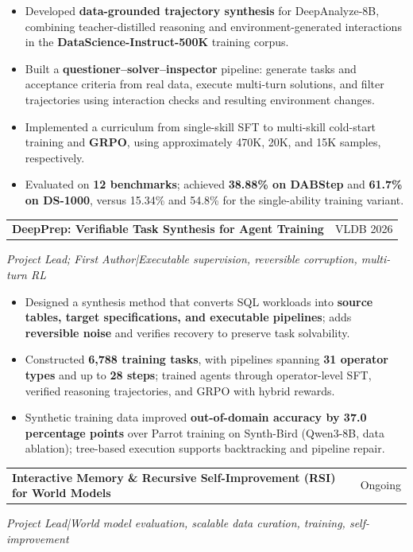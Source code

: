 \documentclass[a4paper,10pt]{article}
\makeatletter
\newcommand{\project}[3]{%
  \needspace{5\baselineskip}\vspace{3pt}
  \begin{tabularx}{\linewidth}{@{}Xr@{}}
  \textbf{#1} & {\small\color{navy}#2}
  \end{tabularx}\par
  {\small\itshape\color{muted}#3}\par
}
\makeatother
\begin{document}
\begin{itemize}
  \item Developed \textbf{data-grounded trajectory synthesis} for DeepAnalyze-8B, combining teacher-distilled reasoning and environment-generated interactions in the \textbf{DataScience-Instruct-500K} training corpus.
  \item Built a \textbf{questioner--solver--inspector} pipeline: generate tasks and acceptance criteria from real data, execute multi-turn solutions, and filter trajectories using interaction checks and resulting environment changes.
  \item Implemented a curriculum from single-skill SFT to multi-skill cold-start training and \textbf{GRPO}, using approximately 470K, 20K, and 15K samples, respectively.
  \item Evaluated on \textbf{12 benchmarks}; achieved \textbf{38.88\% on DABStep} and \textbf{61.7\% on DS-1000}, versus 15.34\% and 54.8\% for the single-ability training variant.
\end{itemize}

\project{DeepPrep: Verifiable Task Synthesis for Agent Training}{VLDB 2026}
{Project Lead; First Author\quad|\quad Executable supervision, reversible corruption, multi-turn RL}

\begin{itemize}
  \item Designed a synthesis method that converts SQL workloads into \textbf{source tables, target specifications, and executable pipelines}; adds \textbf{reversible noise} and verifies recovery to preserve task solvability.
  \item Constructed \textbf{6,788 training tasks}, with pipelines spanning \textbf{31 operator types} and up to \textbf{28 steps}; trained agents through operator-level SFT, verified reasoning trajectories, and GRPO with hybrid rewards.
  \item Synthetic training data improved \textbf{out-of-domain accuracy by 37.0 percentage points} over Parrot training on Synth-Bird (Qwen3-8B, data ablation); tree-based execution supports backtracking and pipeline repair.
\end{itemize}

\project{Interactive Memory \& Recursive Self-Improvement (RSI) for World Models}{Ongoing}
{Project Lead\quad|\quad World model evaluation, scalable data curation, training, self-improvement}
\end{document}
